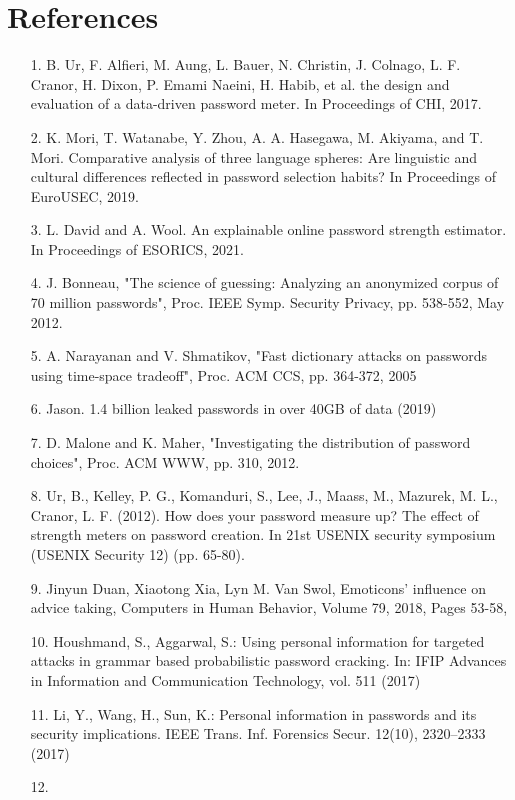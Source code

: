 \documentclass[5p,twocolumn]{elsarticle}
\begin{document}
\section{References}
\label{References}
\begin{enumerate}
\item [1.]
B. Ur, F. Alfieri, M. Aung, L. Bauer, N. Christin, J. Colnago, L. F. Cranor, H. Dixon,
P. Emami Naeini, H. Habib, et al. the design and evaluation of a data-driven password meter. In Proceedings of CHI, 2017.
\item [2.]
K. Mori, T. Watanabe, Y. Zhou, A. A. Hasegawa, M. Akiyama, and T. Mori. Comparative analysis of three language spheres: Are linguistic and cultural differences reflected in password selection habits? In Proceedings of EuroUSEC, 2019.
\item [3.]
L. David and A. Wool. An explainable online password strength estimator. In Proceedings of ESORICS, 2021.
\item [4.]
J. Bonneau, "The science of guessing: Analyzing an anonymized corpus of 70 million passwords", Proc. IEEE Symp. Security Privacy, pp. 538-552, May 2012.
\item [5.]
A. Narayanan and V. Shmatikov, "Fast dictionary attacks on passwords using time-space tradeoff", Proc. ACM CCS, pp. 364-372, 2005
\item [6.]
Jason. 1.4 billion leaked passwords in over 40GB of data (2019) 
\item [7.]
D. Malone and K. Maher, "Investigating the distribution of password choices", Proc. ACM WWW, pp. 310, 2012.
\item [8.]
Ur, B., Kelley, P. G., Komanduri, S., Lee, J., Maass, M., Mazurek, M. L., Cranor, L. F. (2012). How does your password measure up? The effect of strength meters on password creation. In 21st USENIX security symposium (USENIX Security 12) (pp. 65-80).
\item [9.]
Jinyun Duan, Xiaotong Xia, Lyn M. Van Swol, Emoticons' influence on advice taking, Computers in Human Behavior, Volume 79, 2018, Pages 53-58,
\item [10.]
Houshmand, S., Aggarwal, S.: Using personal information for targeted attacks in grammar based probabilistic password cracking. In: IFIP Advances in Information and Communication Technology, vol. 511 (2017)
\item [11.]
Li, Y., Wang, H., Sun, K.: Personal information in passwords and its security
implications. IEEE Trans. Inf. Forensics Secur. 12(10), 2320–2333 (2017)
 \item [12.]

\end{enumerate}
\end{document}
